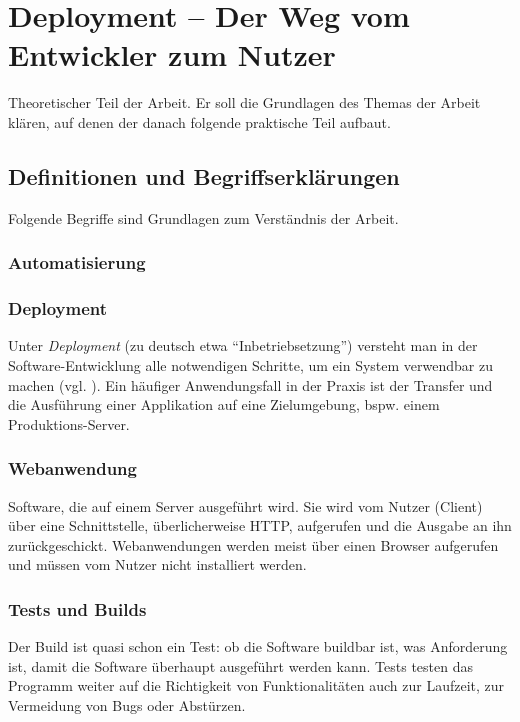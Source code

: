 \chapter{Deployment – Der Weg vom Entwickler zum Nutzer}

Theoretischer Teil der Arbeit. Er soll die Grundlagen des Themas der Arbeit klären, auf denen der danach folgende praktische Teil aufbaut.


\section{Definitionen und Begriffserklärungen}

Folgende Begriffe sind Grundlagen zum Verständnis der Arbeit.

\subsection{Automatisierung}




\subsection{Deployment}

Unter \emph{Deployment} (zu deutsch etwa ``Inbetriebsetzung'') versteht man in der Software-Entwicklung alle notwendigen Schritte, um ein System verwendbar zu machen (vgl. \citep[21]{Breuer2009}). Ein häufiger Anwendungsfall in der Praxis ist der Transfer und die Ausführung einer Applikation auf eine Zielumgebung, bspw. einem Produktions-Server.

\subsection{Webanwendung}

Software, die auf einem Server ausgeführt wird. Sie wird vom Nutzer (Client) über eine Schnittstelle, überlicherweise \ac{HTTP}, aufgerufen und die Ausgabe an ihn zurückgeschickt. Webanwendungen werden meist über einen Browser aufgerufen und müssen vom Nutzer nicht installiert werden.


\subsection{Tests und Builds}

Der Build ist quasi schon ein Test: ob die Software buildbar ist, was Anforderung ist, damit die Software überhaupt ausgeführt werden kann. Tests testen das Programm weiter auf die Richtigkeit von Funktionalitäten auch zur Laufzeit, zur Vermeidung von Bugs oder Abstürzen.

